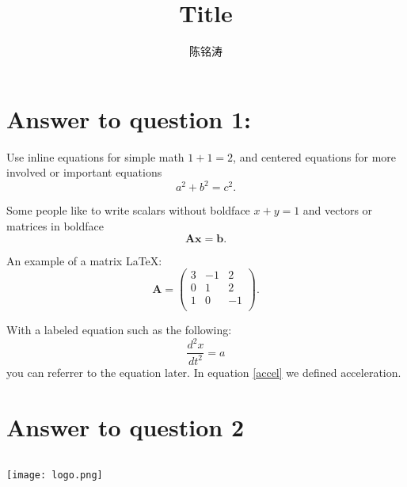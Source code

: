 \documentclass[12pt]{article}
\begin{document}
\author{陈铭涛}
\title{Title}
\maketitle

\medskip


\section{Answer to question 1:}

Use inline equations for simple math $1+1=2$, and centered equations for more involved or important equations
\begin{equation}
    a^2 + b^2 = c^2.
\end{equation}

Some people like to write scalars without boldface $x+y=1$ and vectors or matrices in boldface
\begin{equation}
    \mathbf{A} \mathbf{x} = \mathbf{b}.
\end{equation}

An example of a matrix \LaTeX:
\begin{equation}
    \mathbf{A} = \left(
    \begin{array}{ccc}
    3 & -1 & 2 \\ 	
    0 & 1 & 2 \\ 
    1 & 0 & -1 \\
\end{array} 
\right).  
\end{equation}

With a labeled equation such as the following:
\begin{equation}
    \label{accel}
    \frac{d^2 x}{d t^2} = a
\end{equation}
you can referrer to the equation later. In equation \ref{accel} we defined acceleration.

\section{Answer to question 2}

\begin{lstlisting}

\end{lstlisting}
\begin{center}
    \texttt{[image: logo.png]}
\end{center}
\end{document}
